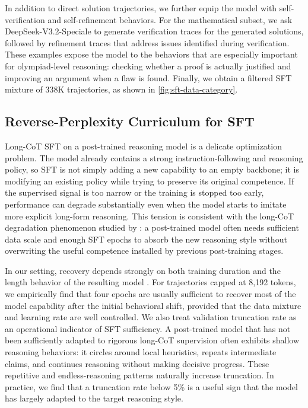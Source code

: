 In addition to direct solution trajectories, we further equip the model with
self-verification and self-refinement behaviors. 
For the mathematical subset, we ask DeepSeek-V3.2-Speciale to generate verification traces for the generated solutions, followed by refinement traces that address issues identified during verification. 
These examples expose the model to the behaviors that are
especially important for olympiad-level reasoning: checking whether a proof is
actually justified and improving an argument when a flaw is found. Finally, we
obtain a filtered SFT mixture of 338K trajectories, as shown in
\cref{fig:sft-data-category}.

\subsection{Reverse-Perplexity Curriculum for SFT}
\label{sec:reverse-ppl-curriculum}

Long-CoT SFT on a post-trained reasoning model is a delicate optimization
problem. The model already contains a strong instruction-following and
reasoning policy, so SFT is not simply adding a new capability to an empty
backbone; it is modifying an existing policy while trying to preserve its
original competence. 
If the supervised signal is too narrow or the training is
stopped too early, performance can degrade substantially even when the model
starts to imitate more explicit long-form reasoning. This tension is consistent
with the long-CoT degradation phenomenon studied by \citet{luo2025through}: a
post-trained model often needs sufficient data scale and enough SFT epochs to
absorb the new reasoning style without overwriting the useful competence
installed by previous post-training stages.

In our setting, recovery depends strongly on both training duration and the
length behavior of the resulting model \citep{ren2026rethinking}. For trajectories capped at 8,192 tokens,
we empirically find that four epochs are usually sufficient to recover most of
the model capability after the initial behavioral shift, provided that the data
mixture and learning rate are well controlled. 
We also treat validation truncation rate as an operational indicator
of SFT sufficiency. A post-trained model that has
not been sufficiently adapted to rigorous long-CoT supervision often exhibits
shallow reasoning behaviors: it circles around local heuristics, repeats
intermediate claims, and continues reasoning without making decisive progress.
These repetitive and endless-reasoning patterns naturally increase truncation.
In practice, we find that a truncation rate below 5\% is a useful sign that the model has
largely adapted to the target reasoning style.

